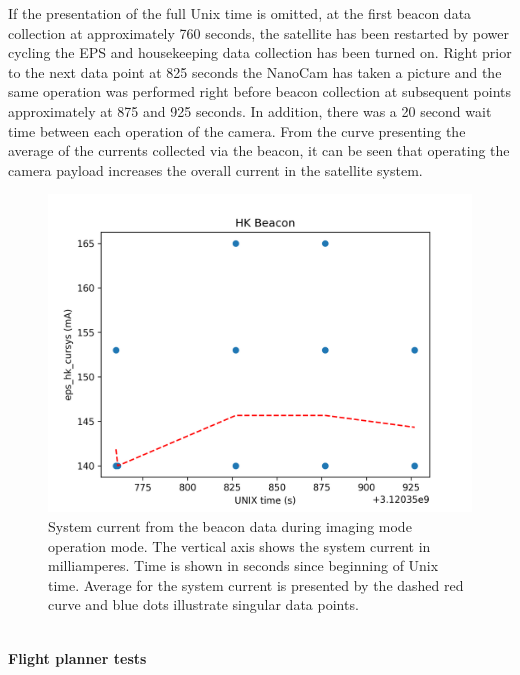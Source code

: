 \documentclass[english,12pt,a4paper,pdftex,elec,utf8]{aaltothesis}
\begin{document}
If the presentation of the full Unix time is omitted, at the first beacon data collection at approximately 760 seconds, the satellite has been restarted by power cycling the EPS and housekeeping data collection has been turned on. Right prior to the next data point at 825 seconds the NanoCam has taken a picture and the same operation was performed right before beacon collection at subsequent points approximately at 875 and 925 seconds. In addition, there was a 20 second wait time between each operation of the camera. From the curve presenting the average of the currents collected via the beacon, it can be seen that operating the camera payload increases the overall current in the satellite system.
\\
\begin{figure}[h!]
\centering
\includegraphics[scale=0.7]{hk_plot_cam_op2_mod}
\caption{System current from the beacon data during imaging mode operation mode. The vertical axis shows the system current in milliamperes. Time is shown in seconds since beginning of Unix time. Average for the system current is presented by the dashed red curve and blue dots illustrate singular data points.}
\label{hkcamplotjoo}
\end{figure}
\\
\textbf{Flight planner tests}
\\ 
\end{document}
